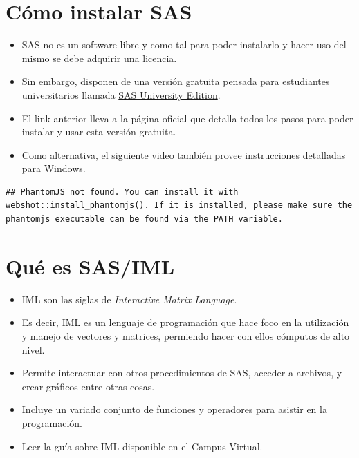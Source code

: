 \documentclass[
]{book}
\providecommand{\tightlist}{%
  \setlength{\itemsep}{0pt}\setlength{\parskip}{0pt}}
\begin{document}
\hypertarget{cuxf3mo-instalar-sas}{%
\section{Cómo instalar SAS}\label{cuxf3mo-instalar-sas}}

\begin{itemize}
\tightlist
\item
  SAS no es un software libre y como tal para poder instalarlo y hacer uso del mismo se debe adquirir una licencia.
\item
  Sin embargo, disponen de una versión gratuita pensada para estudiantes universitarios llamada \href{https://www.sas.com/en_us/software/university-edition.html}{SAS University Edition}.
\item
  El link anterior lleva a la página oficial que detalla todos los pasos para poder instalar y usar esta versión gratuita.
\item
  Como alternativa, el siguiente \href{https://www.youtube.com/watch?v=932o9X-8QzM}{video} también provee instrucciones detalladas para Windows.
\end{itemize}

\begin{verbatim}
## PhantomJS not found. You can install it with webshot::install_phantomjs(). If it is installed, please make sure the phantomjs executable can be found via the PATH variable.
\end{verbatim}

\hypertarget{quuxe9-es-sasiml}{%
\section{Qué es SAS/IML}\label{quuxe9-es-sasiml}}

\begin{itemize}
\tightlist
\item
  IML son las siglas de \emph{Interactive Matrix Language}.
\item
  Es decir, IML es un lenguaje de programación que hace foco en la utilización y manejo de vectores y matrices, permiendo hacer con ellos cómputos de alto nivel.
\item
  Permite interactuar con otros procedimientos de SAS, acceder a archivos, y crear gráficos entre otras cosas.
\item
  Incluye un variado conjunto de funciones y operadores para asistir en la programación.
\item
  Leer la guía sobre IML disponible en el Campus Virtual.
\end{itemize}
\end{document}
